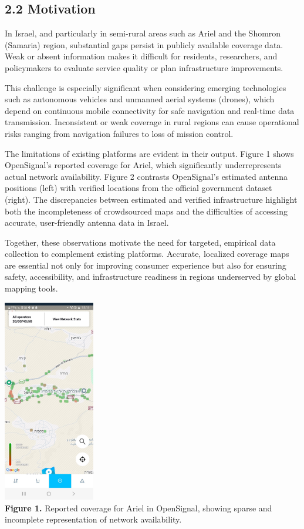 \documentclass[11pt]{article}
\begin{document}
\hypertarget{motivation}{%
\subsection{2.2 Motivation}\label{motivation}}

In Israel, and particularly in semi-rural areas such as Ariel and the
Shomron (Samaria) region, substantial gaps persist in publicly available
coverage data. Weak or absent information makes it difficult for
residents, researchers, and policymakers to evaluate service quality or
plan infrastructure improvements.

This challenge is especially significant when considering emerging
technologies such as autonomous vehicles and unmanned aerial systems
(drones), which depend on continuous mobile connectivity for safe
navigation and real-time data transmission. Inconsistent or weak
coverage in rural regions can cause operational risks ranging from
navigation failures to loss of mission control.

The limitations of existing platforms are evident in their output.
Figure 1 shows OpenSignal's reported coverage for Ariel, which
significantly underrepresents actual network availability. Figure 2
contrasts OpenSignal's estimated antenna positions (left) with verified
locations from the official government dataset (right). The
discrepancies between estimated and verified infrastructure highlight
both the incompleteness of crowdsourced maps and the difficulties of
accessing accurate, user-friendly antenna data in Israel.

Together, these observations motivate the need for targeted, empirical
data collection to complement existing platforms. Accurate, localized
coverage maps are essential not only for improving consumer experience
but also for ensuring safety, accessibility, and infrastructure
readiness in regions underserved by global mapping tools.

\includegraphics[width=1.56771in,height=3.49541in]{figures/media/image2.jpg}\\
\textbf{Figure 1.} Reported coverage for Ariel in OpenSignal, showing
sparse and incomplete representation of network availability.
\end{document}
